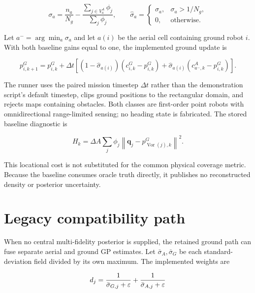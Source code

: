 \documentclass[11pt]{article}
\begin{document}
\begin{equation}
\sigma_a
=
\frac{n_a}{N_g}
-
\frac{\sum_{j\in V^A_a}\phi_j}{\sum_j\phi_j},
\qquad
\widehat\sigma_a
=
\begin{cases}
\sigma_a,&\sigma_a>1/N_g,\\
0,&\text{otherwise}.
\end{cases}
\end{equation}


Let $a^- = \arg\min_a\sigma_a$ and let $a(i)$ be the aerial cell containing
ground robot $i$. With both baseline gains equal to one, the implemented
ground update is


\begin{equation}
p^G_{i,k+1}
=
p^G_{i,k}
+
\Delta t
\left[
\left(1-\widehat\sigma_{a(i)}\right)
\left(c^G_{i,k}-p^G_{i,k}\right)
+
\widehat\sigma_{a(i)}
\left(c^A_{a^-,k}-p^G_{i,k}\right)
\right].
\end{equation}


The runner uses the paired mission timestep $\Delta t$ rather than the
demonstration script's default timestep, clips ground positions to the
rectangular domain, and rejects maps containing obstacles. Both classes are
first-order point robots with omnidirectional range-limited sensing; no heading
state is fabricated. The stored baseline diagnostic is


\begin{equation}
H_k
=
\Delta A
\sum_j
\phi_j
\left\|\mathbf q_j-p^G_{\operatorname{Vor}(j),k}\right\|^2.
\end{equation}


This locational cost is not substituted for the common physical coverage
metric. Because the baseline consumes oracle truth directly, it publishes no
reconstructed density or posterior uncertainty.


\section{Legacy compatibility path}


When no central multi-fidelity posterior is supplied, the retained ground path can fuse separate aerial and ground GP estimates. Let $\bar\sigma_A,\bar\sigma_G$ be each standard-deviation field divided by its own maximum. The implemented weights are


\begin{equation}
d_j \\
= \\
\frac{1}{\bar\sigma_{G,j}+\varepsilon} \\
+ \\
\frac{1}{\bar\sigma_{A,j}+\varepsilon}
\end{equation}
\end{document}

